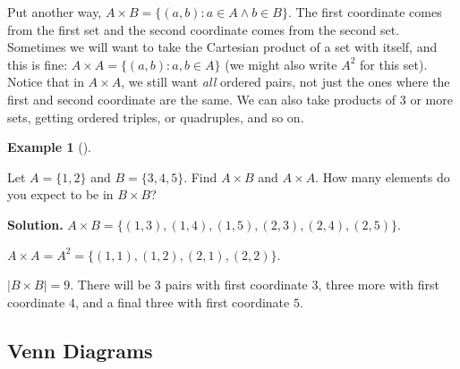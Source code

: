 \documentclass[10pt,]{book}
\theoremstyle{plain}
\theoremstyle{definition}
\newtheorem{example}[theorem]{Example}
\theoremstyle{definition}
\theoremstyle{definition}
\numberwithin{equation}{section}
\def\st{:}
\begin{document}
      Put another way, \(A \times B = \{(a,b) \st a \in A \wedge b \in B\}\). The first coordinate comes from the first set and the second coordinate comes from the second set. Sometimes we will want to take the Cartesian product of a set with itself, and this is fine: \(A \times A = \{(a,b) \st a, b \in A\}\) (we might also write \(A^2\) for this set). Notice that in \(A \times A\), we still want \emph{all} ordered pairs, not just the ones where the first and second coordinate are the same. We can also take products of 3 or more sets, getting ordered triples, or quadruples, and so on.
\begin{example}[]\label{example-15}

          Let \(A = \{1,2\}\) and \(B = \{3,4,5\}\). Find \(A \times B\) and \(A \times A\). How many elements do you expect to be in \(B \times B\)?
\par\medskip\noindent%
\textbf{Solution.}\quad 
          \(A \times B = \{(1,3), (1,4), (1,5), (2,3), (2,4), (2,5)\}\).
\par

          \(A \times A = A^2 = \{(1,1), (1,2), (2,1), (2,2)\}\).
\par

          \(|B\times B| = 9\). There will be 3 pairs with first coordinate \(3\), three more with first coordinate \(4\), and a final three with first coordinate \(5\).
\end{example}
\typeout{************************************************}
\typeout{************************************************}
\subsection[Venn Diagrams]{Venn Diagrams}\label{subsection-7}
\end{document}
